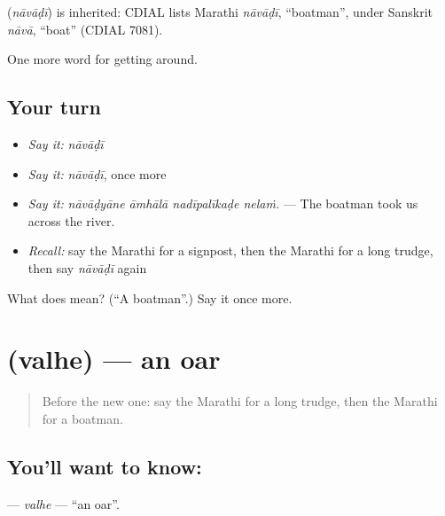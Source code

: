 \begin{cousinweb}
\textbf{} (\emph{nāvāḍī}) is inherited: CDIAL lists Marathi \emph{nāvāḍī}, \textquotedblleft{}boatman\textquotedblright{}, under Sanskrit \emph{nāvā}, \textquotedblleft{}boat\textquotedblright{} (CDIAL 7081).
\end{cousinweb}

\begin{grammarlens}[title={What you've built}]
One more word for getting around.
\end{grammarlens}

\subsection*{Your turn}
\begin{itemize}
\raggedright
  \item \emph{Say it:} \emph{nāvāḍī}
  \item \emph{Say it:} \emph{nāvāḍī}, once more
  \item \emph{Say it:} \emph{nāvāḍyāne āmhālā nadīpalīkaḍe nelaṁ.} — The boatman took us across the river.
  \item \emph{Recall:} say the Marathi for a signpost, then the Marathi for a long trudge, then say \emph{nāvāḍī} again
\end{itemize}

\begin{tcolorbox}[breakable,colback=teal!4,colframe=teal!35!black,title={Before you move on}]
What does  mean? (\textquotedblleft{}A boatman\textquotedblright{}.) Say it once more.
\end{tcolorbox}
\section[\texorpdfstring{\mr{वल्हे} (valhe)}{वल्हे (valhe)}]{ (valhe) — an oar}

\label{lesson:MR-C408-valhe}



\begin{quote}
Before the new one: say the Marathi for a long trudge, then the Marathi for a boatman.
\end{quote}

\subsection*{You'll want to know: }
\textbf{} — \emph{valhe} — \textquotedblleft{}an oar\textquotedblright{}.

